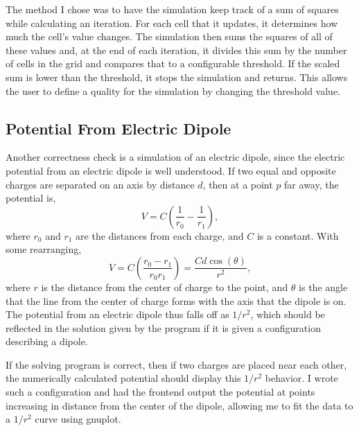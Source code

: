 The method I chose was to have the simulation keep track of a sum of squares while calculating an iteration. For each cell
that it updates, it determines how much the cell's value changes. The simulation then sums the squares of all of these values
and, at the end of each iteration, it divides this sum by the number of cells in the grid and compares that to a configurable threshold.
If the scaled sum is lower than the threshold, it stops the simulation and returns. This allows the user to define a quality for
the simulation by changing the threshold value.









\subsection{Potential From Electric Dipole}
Another correctness check is a simulation of an electric dipole, since the electric potential from an electric dipole is well understood.
If two equal and opposite charges are separated on an axis by distance $d$, then at a point $p$ far away, the
potential is,
$$V = C\left(\frac{1}{r_0} - \frac{1}{r_1}\right),$$
where $r_0$ and $r_1$ are the distances from each charge, and $C$ is a constant. With some rearranging,
$$V = C\left(\frac{r_0 - r_1}{r_0 r_1}\right) = \frac{C d \cos(\theta)}{r^2},$$
where $r$ is the distance from the center of charge to the point, and $\theta$ is the angle that the line from the
center of charge forms with the axis that the dipole is on\cite{griffiths}. The potential from an electric dipole thus falls off as $1/r^2$,
which should be reflected in the solution given by the program if it is given a configuration describing a dipole.

If the solving program is correct, then if two charges are placed near each other, the numerically calculated potential
should display this $1/r^2$ behavior. I wrote such a configuration and had the frontend output the potential at points
increasing in distance from the center of the dipole, allowing me to fit the data to a $1/r^2$ curve using gnuplot.














